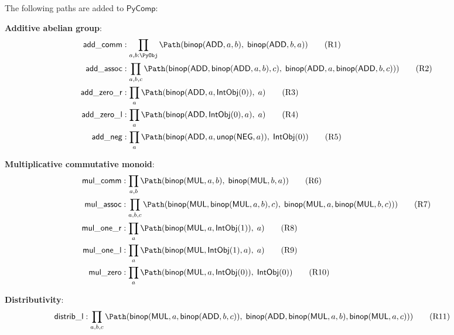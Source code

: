 \begin{definition}
\label{def:int-ring}
The following paths are added to $\mathsf{PyComp}$:

\textbf{Additive abelian group}:
\begin{align}
  \mathsf{add\_comm} &: \prod_{a,b : \PyObj}
    \Path(\mathsf{binop}(\mathsf{ADD}, a, b),\;
          \mathsf{binop}(\mathsf{ADD}, b, a))
    \tag{R1} \\
  \mathsf{add\_assoc} &: \prod_{a,b,c}
    \Path(\mathsf{binop}(\mathsf{ADD}, \mathsf{binop}(\mathsf{ADD}, a, b), c),\;
          \mathsf{binop}(\mathsf{ADD}, a, \mathsf{binop}(\mathsf{ADD}, b, c)))
    \tag{R2} \\
  \mathsf{add\_zero\_r} &: \prod_a
    \Path(\mathsf{binop}(\mathsf{ADD}, a, \mathsf{IntObj}(0)),\; a)
    \tag{R3} \\
  \mathsf{add\_zero\_l} &: \prod_a
    \Path(\mathsf{binop}(\mathsf{ADD}, \mathsf{IntObj}(0), a),\; a)
    \tag{R4} \\
  \mathsf{add\_neg} &: \prod_a
    \Path(\mathsf{binop}(\mathsf{ADD}, a, \mathsf{unop}(\mathsf{NEG}, a)),\;
          \mathsf{IntObj}(0))
    \tag{R5}
\end{align}

\textbf{Multiplicative commutative monoid}:
\begin{align}
  \mathsf{mul\_comm} &: \prod_{a,b}
    \Path(\mathsf{binop}(\mathsf{MUL}, a, b),\;
          \mathsf{binop}(\mathsf{MUL}, b, a))
    \tag{R6} \\
  \mathsf{mul\_assoc} &: \prod_{a,b,c}
    \Path(\mathsf{binop}(\mathsf{MUL}, \mathsf{binop}(\mathsf{MUL}, a, b), c),\;
          \mathsf{binop}(\mathsf{MUL}, a, \mathsf{binop}(\mathsf{MUL}, b, c)))
    \tag{R7} \\
  \mathsf{mul\_one\_r} &: \prod_a
    \Path(\mathsf{binop}(\mathsf{MUL}, a, \mathsf{IntObj}(1)),\; a)
    \tag{R8} \\
  \mathsf{mul\_one\_l} &: \prod_a
    \Path(\mathsf{binop}(\mathsf{MUL}, \mathsf{IntObj}(1), a),\; a)
    \tag{R9} \\
  \mathsf{mul\_zero} &: \prod_a
    \Path(\mathsf{binop}(\mathsf{MUL}, a, \mathsf{IntObj}(0)),\;
          \mathsf{IntObj}(0))
    \tag{R10}
\end{align}

\textbf{Distributivity}:
\begin{align}
  \mathsf{distrib\_l} &: \prod_{a,b,c}
    \Path(\mathsf{binop}(\mathsf{MUL}, a,
      \mathsf{binop}(\mathsf{ADD}, b, c)),\;
      \mathsf{binop}(\mathsf{ADD},
        \mathsf{binop}(\mathsf{MUL}, a, b),
        \mathsf{binop}(\mathsf{MUL}, a, c)))
    \tag{R11}
\end{align}


\end{definition}

